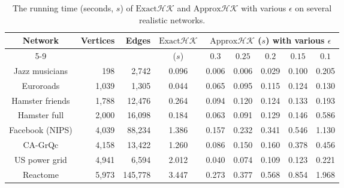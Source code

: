 \documentclass[10pt,twocolumn,twoside]{IEEEtran}
\begin{document}
\begin{table}[htbp]
    \centering
    \normalsize
    \fontsize{8.0}{8.8}\selectfont
    \begin{threeparttable}
        \caption{The running time (seconds, \(s\)) of \(\text{Exact}\mathcal{HK}\) and \(\text{Approx}\mathcal{HK}\) with various \(\epsilon\) on several realistic networks.}
        \label{tab:runtime_comparison}
        \begin{tabular}{crrcccccc}
            \toprule
            \multirow{2}{*}{Network}                      &
            \multirow{2}{*}{Vertices}                     &
            \multirow{2}{*}{Edges}                        &
            \multirow{2}{*}{\(\text{Exact}\mathcal{HK}\)} &
            \multicolumn{5}{c}{\(\text{Approx}\mathcal{HK}\) (\(s\)) with various \(\epsilon\)}                                                 \\
            \cmidrule{5-9}                                &           &           & (\(s\)) & \(0.3\) & \(0.25\) & \(0.2\) & \(0.15\) & \(0.1\) \\
            \midrule
            Jazz musicians                                & 198       & 2,742     & 0.096   & 0.006   & 0.006    & 0.029   & 0.100    & 0.205   \\
            Euroroads                                     & 1,039     & 1,305     & 0.044   & 0.065   & 0.095    & 0.115   & 0.124    & 0.130   \\
            Hamster friends                               & 1,788     & 12,476    & 0.264   & 0.094   & 0.120    & 0.124   & 0.133    & 0.193   \\
            Hamster full                                  & 2,000     & 16,098    & 0.184   & 0.063   & 0.091    & 0.129   & 0.146    & 0.586   \\
            Facebook (NIPS)                               & 4,039     & 88,234    & 1.386   & 0.157   & 0.232    & 0.341   & 0.546    & 1.130   \\
            CA-GrQc                                       & 4,158     & 13,422    & 1.260   & 0.086   & 0.150    & 0.160   & 0.378    & 0.456   \\
            US power grid                                 & 4,941     & 6,594     & 2.012   & 0.040   & 0.074    & 0.109   & 0.123    & 0.221   \\
            Reactome                                      & 5,973     & 145,778   & 3.447   & 0.273   & 0.377    & 0.568   & 0.854    & 1.968   \\

\end{tabular}
\end{threeparttable}
\end{table}
\end{document}
